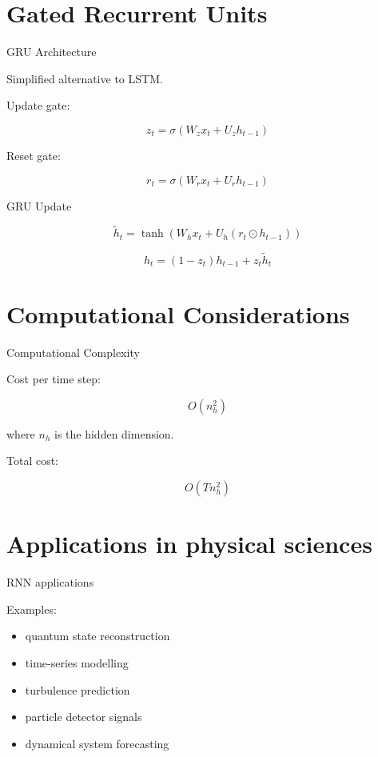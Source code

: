 \documentclass{beamer}
\begin{document}
\section{Gated Recurrent Units}

\begin{frame}{GRU Architecture}

Simplified alternative to LSTM.

Update gate:

\[
z_t = \sigma(W_z x_t + U_z h_{t-1})
\]

Reset gate:

\[
r_t = \sigma(W_r x_t + U_r h_{t-1})
\]
\end{frame}

\begin{frame}{GRU Update}

\[
\tilde h_t =
\tanh(W_h x_t + U_h (r_t \odot h_{t-1}))
\]

\[
h_t =
(1-z_t)h_{t-1} + z_t \tilde h_t
\]
\end{frame}

\section{Computational Considerations}

\begin{frame}{Computational Complexity}

Cost per time step:

\[
O(n_h^2)
\]

where \(n_h\) is the hidden dimension.

Total cost:

\[
O(Tn_h^2)
\]
\end{frame}

\section{Applications in physical sciences}

\begin{frame}{RNN applications}

Examples:

\begin{itemize}
\item quantum state reconstruction
\item time-series modelling
\item turbulence prediction
\item particle detector signals
\item dynamical system forecasting
\end{itemize}
\end{frame}
\end{document}
